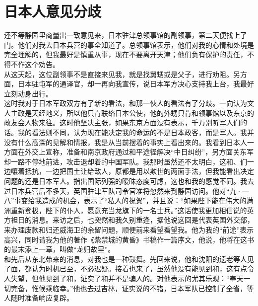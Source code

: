 \fancyhead[RO]{} %
\fancyhead[LE]{} %
\chapter*{日本人意见分歧}
\thispagestyle{empty}
还不等静园里商量出一致意见来，日本驻津总领事馆的副领事，第二天便找上了门。他们对我去日本兵营的事全知道了。总领事馆表示，他们对我的心情和处境是完全理解的，但我最好是慎重从事，现在不要离开天津；他们负有保护的责任，不得不作这个劝告。\\

从这天起，这位副领事不是直接来见我，就是找舅甥或是父子，进行劝阻。另方面，日本驻屯军的通译官，却一再向我宣传，说日本军方决心支持我上台，我最好立刻动身出行。\\

这时我对于日本军政双方有了新的看法，和那一伙人的看法有了分歧。一向认为文人主政是天经地义，所以他只肯联络日本公使，他的外甥只肯和领事馆以及东京的政友会人物来往。这时他坚决主张，如果东京方面没有表示，千万别听军人们的话。我的看法则不同，认为现在能决定我的命运的不是日本政客，而是军人。我并没有什么高深的见解和情报，我是从当前摆着的事实上看出来的。我看到日本人一方面在外交上宣称，准备和南京政府通过和平途径解决“中日纠纷”，另方面关东军却一路不停地前进，攻击退却着的中国军队。我那时虽然还不太明白，这和、们一边嚷着抵抗，一边把国土让给敌人，原都是用以欺世的两面手法，但我能看出决定问题的还是日本军人。指出国际列强的暧昧态度可虑，这也和我的感觉不同。我去过日本兵营后不多天，英国驻津军队司令官准将忽然来到静园访问。他对“九·一八”事变给我造成的机会，表示了“私人的祝贺”，并且说：“如果陛下能在伟大的满洲重新登极，陛下的仆人，愿意充当龙旗下的一名士兵。”这话使我更加相信说的英方袒日的消息。来访之后，也突然和我久别重逢，据他说这回是代表英国外交部，来办理废款和归还威海卫的余留问题，顺便前来看望看望我。他为我的“前途”表示高兴，同时请我为他的著作《紫禁城的黄昏》书稿作一篇序文，他说，他将在这书的最末添上一章，叫做“龙归故里”。\\

和先后从东北带来的消息，对我也是一种鼓舞。先回来说，他和沈阳的遗老等人见了面，都认为时机已至，不必迟疑。接着也来了，虽然他没有能见到和，这有点令人失望，但他见到了和，证实了和并不是骗人的。对他表示的尤其乐观：“奉天一切完备，惟候乘临幸。”他也去过吉林，证实说的不错，日本军队已控制了全省，等人随时准备响应复辟。\\


